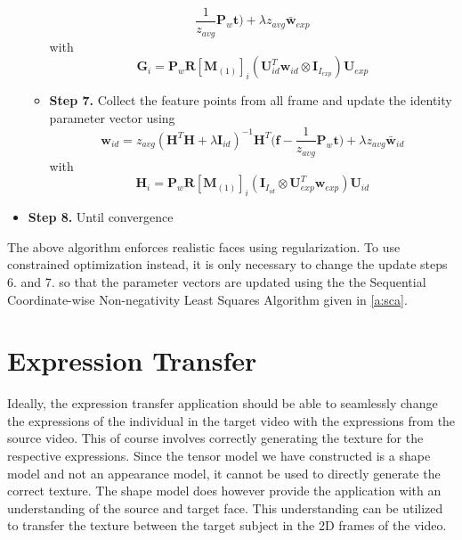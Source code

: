 \documentclass[11pt,a4paper]{report}
\begin{document}
\begin{itemize}
\begin{itemize}
\begin{equation*}
\frac{1}{z_{avg}}\mathbf{P}_w\mathbf{t}\bigr) + \lambda z_{avg}\mathbf{\bar{w}}_{exp}
\end{equation*}
with 
\begin{equation*}
\mathbf{G}_i =
\mathbf{P}_w\mathbf{R}[\mathbf{M}_{(1)}]_{i}(\mathbf{U}_{id}^T\mathbf{w}_{id}
\otimes \mathbf{I}_{I_{exp}})\mathbf{U}_{exp}
\end{equation*}
\item[\textbullet] \textbf{Step 7.} Collect the feature points from all frame
  and update the identity parameter vector using 
\begin{equation*}
\mathbf{w}_{id} =z_{avg}(\mathbf{H}^T\mathbf{H} + \lambda\mathbf{I}_{id})^{-1}\mathbf{H}^T\bigl(\mathbf{f}
- \frac{1}{z_{avg}}\mathbf{P}_w\mathbf{t}\bigr) + \lambda z_{avg}\mathbf{\bar{w}}_{id}
\end{equation*}
with
\begin{equation*}
\mathbf{H}_i = \mathbf{P}_w\mathbf{R}[\mathbf{M}_{(1)}]_{i}(\mathbf{I}_{I_{id}}
\otimes \mathbf{U}_{exp}^T\mathbf{w}_{exp})\mathbf{U}_{id}
\end{equation*}
\end{itemize}
\item \textbf{Step 8.} Until convergence 
\end{itemize}
The above algorithm enforces realistic faces using
regularization. To use constrained optimization instead, it is only necessary to
change the update steps 6. and 7. so that the parameter vectors are updated using
the the Sequential Coordinate-wise Non-negativity Least Squares Algorithm given
in \ref{a:sca}.

\section{Expression Transfer}\label{s:exptranalgo}
Ideally, the expression transfer application should be able to seamlessly change
the expressions of the individual in the target video with the expressions from
the source video. This of course involves correctly generating the texture for
the respective expressions. Since the tensor model we have constructed is a
shape model and not an appearance model, it cannot be used to directly generate
the correct texture. The shape model does however provide the application with an
understanding of the source and target face. This understanding can be utilized
to transfer the texture between the target subject in the 2D frames of the
video.
\end{document}
